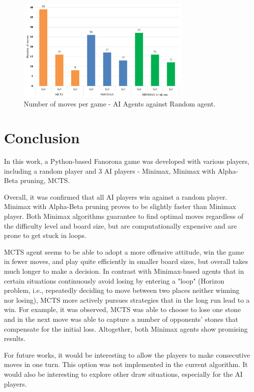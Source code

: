 \documentclass[journal]{IEEEtran}
\begin{document}
\begin{figure}[h!]
    \includegraphics[width = 8.5cm]{movespgame}
    \caption{Number of moves per game - AI Agents against Random agent.}
    \label{fig:movespgame}
\end{figure}

\newpage
\section{Conclusion}

In this work, a Python-based Fanorona game was developed with various players, including a random player and 3 AI players - Minimax, Minimax with Alpha-Beta pruning, MCTS. 

Overall, it was confirmed that all AI players win against a random player. Minimax with Alpha-Beta pruning proves to be slightly faster than Minimax player. Both Minimax algorithms guarantee to find optimal moves regardless of the difficulty level and board size, but are computationally expensive and are prone to get stuck in loops. 

MCTS agent seems to be able to adopt a more offensive attitude, win the game in fewer moves, and play quite efficiently in smaller board sizes, but overall takes much longer to make a decision. In contrast with Minimax-based agents that in certain situations continuously avoid losing by entering a "loop" (Horizon problem, i.e., repeatedly deciding  to move between two places neither winning nor losing), MCTS more actively pursues strategies that in the long run lead to a win. For example, it was observed, MCTS was able to choose to lose one stone and in the next move was able to capture a number of opponents' stones that compensate for the initial loss. Altogether, both Minimax agents show promising results.

For future works, it would be interesting to allow the players to make consecutive moves in one turn. This option was not implemented in the current algorithm. It would also be interesting to explore other draw situations, especially for the AI players. 
\end{document}
